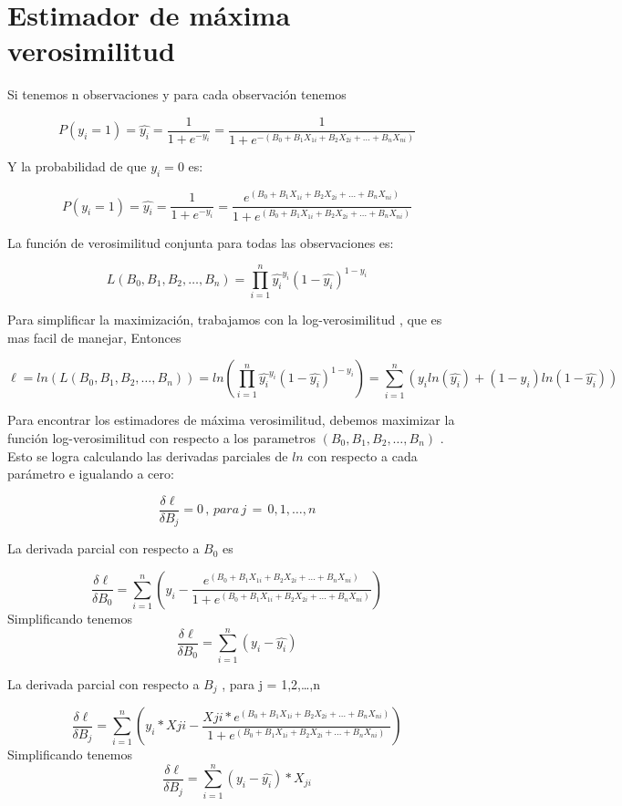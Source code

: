 \section{Estimador de máxima verosimilitud}

Si tenemos n observaciones y para cada observación tenemos \medskip

$$ P(y_i =1 ) = \widehat{y_{i}}= \frac{1}{1+e^{-y_i}} = \frac{1}{1+e^{-(B_0 + B_1X_{1i} + B_2X_{2i}+ \dots + B_nX_{ni})}} $$  \medskip

Y la probabilidad de que $ y_i = 0 $ es:\medskip

$$ P(y_i =1 ) = \widehat{y_{i}}= \frac{1}{1+e^{-y_i}} = \frac{e^{(B_0 + B_1X_{1i} + B_2X_{2i}+ \dots + B_nX_{ni})}}{1+e^{(B_0 + B_1X_{1i} + B_2X_{2i}+ \dots + B_nX_{ni})}} $$  \medskip

La función de verosimilitud conjunta para todas las observaciones es: \medskip

$$ L(B_0 , B_1, B_2 , \dots,B_n) = \prod_{{i=1}}^{n} {\widehat{y_i}^{y_i}(1- \widehat{y_i})^{1- y_i}} $$ \medskip

Para simplificar la maximización, trabajamos con la log-verosimilitud , que es mas facil de manejar, Entonces \medskip

$$  \ell = ln(L(B_0 , B_1, B_2 , \dots,B_n)) =  ln(\prod_{i=1}^{n} \widehat{y_i}^{y_i}(1- \widehat{y_i})^{1- y_i}) = \sum_{i=1}^{n} (y_i ln(\widehat{y_i})+(1-y_i)ln(1- \widehat{y_i})) $$  \medskip

Para encontrar los estimadores de máxima verosimilitud, debemos maximizar la función 
log-verosimilitud con respecto a los parametros $(B_0 , B_1, B_2 , \dots,B_n)$ . Esto se logra calculando
las derivadas parciales de $ln$ con respecto a cada parámetro e igualando a cero:

$$ \frac{\delta \ell}{\delta B_j} =0 \, , \, para \, j\, =\, 0,1,\dots,n $$ \medskip

La derivada parcial con respecto a $B_0$ es \medskip

$$ \frac{\delta \ell}{\delta B_0} = \sum_{i=1}^{n} \displaystyle{\left(y_i - \frac{e^{(B_0 + B_1X_{1i} + B_2X_{2i}+ \dots + B_nX_{ni})}}{1+e^{(B_0 + B_1X_{1i} + B_2X_{2i}+ \dots + B_nX_{ni})}}\right)} $$ \medskip
Simplificando tenemos \\
$$ \frac{\delta \ell}{\delta B_0} = \sum_{i=1}^{n} (y_i - \widehat{y_i}) $$ \medskip

La derivada parcial con respecto a $B_j$ , para j = 1,2,\dots,n \medskip

$$ \frac{\delta \ell}{\delta B_j} = \sum_{i=1}^{n} \displaystyle{\left(y_i *X{ji} - \frac{ X{ji}* e^{(B_0 + B_1X_{1i} + B_2X_{2i}+ \dots + B_nX_{ni})}}{1+e^{(B_0 + B_1X_{1i} + B_2X_{2i}+ \dots + B_nX_{ni})}}\right)} $$ \medskip
Simplificando tenemos \\
$$ \frac{\delta \ell}{\delta B_j} = \sum_{i=1}^{n} (y_i - \widehat{y_i})* X_{ji} $$ \medskip

